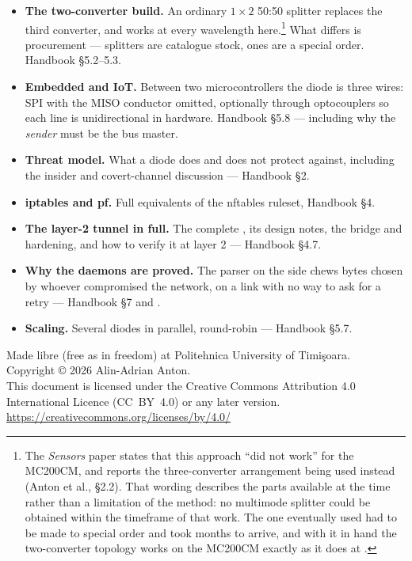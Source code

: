 \documentclass[11pt,a4paper]{article}
\begin{document}
\begin{itemize}
\item \textbf{The two-converter build.} An ordinary $1\times2$ 50:50 splitter
      replaces the third converter, and works at every wavelength
      here.\footnote{The \emph{Sensors} paper states that this approach ``did
      not work'' for the MC200CM, and reports the three-converter arrangement
      being used instead (Anton et al., \S2.2). That wording describes the
      parts available at the time rather than a limitation of the method: no
       multimode splitter could be obtained within the timeframe of
      that work. The one eventually used had to be made to special order and
      took months to arrive, and with it in hand the two-converter topology
      works on the MC200CM exactly as it does at .} What differs is
      procurement ---  splitters are catalogue stock,  ones
      are a special order. Handbook \S5.2--5.3.
\item \textbf{Embedded and IoT.} Between two microcontrollers the diode is
      three wires: SPI with the MISO conductor omitted, optionally through
      optocouplers so each line is unidirectional in hardware. Handbook
      \S5.8 --- including why the \emph{sender} must be the bus master.
\item \textbf{Threat model.} What a diode does and does not protect against,
      including the insider and covert-channel discussion --- Handbook \S2.
\item \textbf{iptables and pf.} Full equivalents of the nftables ruleset,
      Handbook \S4.
\item \textbf{The layer-2 tunnel in full.} The complete ,
      its design notes, the bridge and  hardening, and how to
      verify it at layer 2 --- Handbook \S4.7.
\item \textbf{Why the daemons are proved.} The parser on the \dstside{} side
      chews bytes chosen by whoever compromised the \srcside{} network, on a
      link with no way to ask for a retry --- Handbook \S7 and
      .
\item \textbf{Scaling.} Several diodes in parallel, round-robin ---
      Handbook \S5.7.
\end{itemize}

\vfill
\begin{center}\small
\textcolor{ldgray}{%
Made \copyleft{} libre (free as in freedom) at
Politehnica University of Timi\c{s}oara.\\
Copyright \copyright{} 2026 Alin-Adrian Anton.\\
This document is licensed under the Creative Commons Attribution 4.0
International Licence (CC~BY~4.0) or any later version.\\
\url{https://creativecommons.org/licenses/by/4.0/}}
\end{center}
\end{document}
